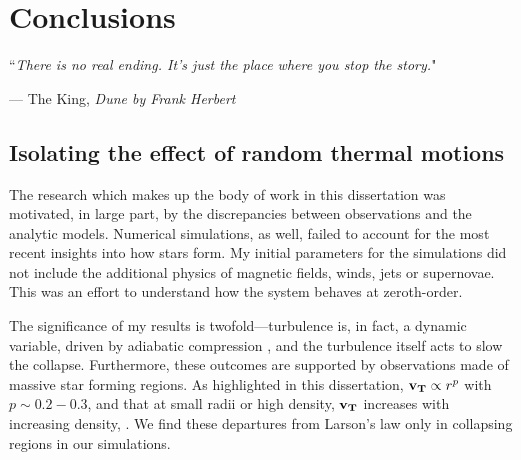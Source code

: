 \documentclass[../dissertation.tex]{subfiles}
\begin{document}
\chapter{Conclusions}
\label{ch:conclusions}

\singlespace
\epigraph{``\emph{There is no real ending. It's just the place where you stop the story.}"}{--- \textup{The King}, \textit{Dune by Frank Herbert}}

\dblspace


\section{Isolating the effect of random thermal motions}

The research which makes up the body of work in this dissertation was motivated, in large part, 
by the discrepancies between observations and the analytic models. 
Numerical simulations, as well, failed to account for the most recent insights into how stars form. 
My initial parameters for the simulations did not include the additional physics of magnetic fields, winds, jets or supernovae. 
This was an effort to understand how the system behaves at zeroth-order. 

The significance of my results is twofold---turbulence is, in fact, a dynamic variable, driven by adiabatic compression \citep{2012ApJ...750L..31R}, 
and the turbulence itself acts to slow the collapse. 
Furthermore, these outcomes are supported by observations made of massive star forming regions. 
As highlighted in this dissertation,  $\mathbf{v_T} \propto r^p$ with $ p \sim 0.2-0.3$, and that at small radii or high density, $\mathbf{v_T}$  
increases with increasing density, \citep{1997ApJ...476..730P}. 
We find these departures from Larson's law only in collapsing regions in our simulations. 
\end{document}
